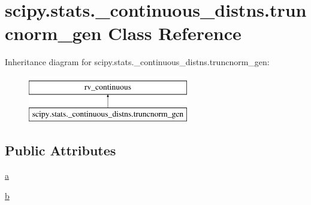 \hypertarget{classscipy_1_1stats_1_1__continuous__distns_1_1truncnorm__gen}{}\section{scipy.\+stats.\+\_\+continuous\+\_\+distns.\+truncnorm\+\_\+gen Class Reference}
\label{classscipy_1_1stats_1_1__continuous__distns_1_1truncnorm__gen}
Inheritance diagram for scipy.\+stats.\+\_\+continuous\+\_\+distns.\+truncnorm\+\_\+gen\+:\begin{figure}[H]
\begin{center}
\leavevmode
\includegraphics[height=2.000000cm]{classscipy_1_1stats_1_1__continuous__distns_1_1truncnorm__gen}
\end{center}
\end{figure}
\subsection*{Public Attributes}
\begin{DoxyCompactItemize}
\item 
\hyperlink{classscipy_1_1stats_1_1__continuous__distns_1_1truncnorm__gen_aa2ca385d556782737244bf0ec699e0f3}{a}
\item 
\hyperlink{classscipy_1_1stats_1_1__continuous__distns_1_1truncnorm__gen_a4505515b4e1e38c352507e2ec5847c81}{b}
\end{DoxyCompactItemize}


